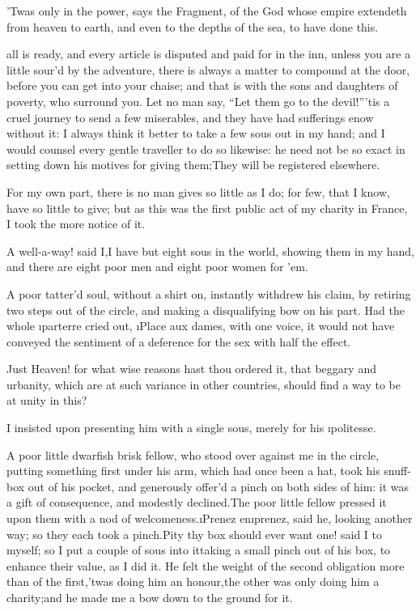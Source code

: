 \documentclass[twoside]{article}
\begin{document}
’Twas only in the power, says the Fragment, of the God whose empire
extendeth from heaven to earth, and even to the depths of the sea, to
have done this.






 all is ready, and every article is disputed and paid for in the inn,
unless you are a little sour’d by the adventure, there is always a matter
to compound at the door, before you can get into your chaise; and that is
with the sons and daughters of poverty, who surround you.  Let no man
say, “Let them go to the devil!”\tsk ’tis a cruel journey to send a few
miserables, and they have had sufferings enow without it: I always think
it better to take a few sous out in my hand; and I would counsel every
gentle traveller to do so likewise: he need not be so exact in setting
down his motives for giving them;\tsk They will be registered elsewhere.

For my own part, there is no man gives so little as I do; for few, that I
know, have so little to give; but as this was the first public act of my
charity in France, I took the more notice of it.

A well-a-way! said I,\tsk I have but eight sous in the world, showing them in
my hand, and there are eight poor men and eight poor women for ’em.

A poor tatter’d soul, without a shirt on, instantly withdrew his claim,
by retiring two steps out of the circle, and making a disqualifying bow
on his part.  Had the whole \i{parterre} cried out, \i{Place aux dames}, with
one voice, it would not have conveyed the sentiment of a deference for
the sex with half the effect.

Just Heaven! for what wise reasons hast thou ordered it, that beggary and
urbanity, which are at such variance in other countries, should find a
way to be at unity in this?

\tsk I insisted upon presenting him with a single sous, merely for his
\i{politesse}.

A poor little dwarfish brisk fellow, who stood over against me in the
circle, putting something first under his arm, which had once been a hat,
took his snuff-box out of his pocket, and generously offer’d a pinch on
both sides of him: it was a gift of consequence, and modestly
declined.\tsk The poor little fellow pressed it upon them with a nod of
welcomeness.\tsk \i{Prenez en}\tsk \i{prenez}, said he, looking another way; so they
each took a pinch.\tsk Pity thy box should ever want one! said I to myself;
so I put a couple of sous into it\tsk taking a small pinch out of his box, to
enhance their value, as I did it.  He felt the weight of the second
obligation more than of the first,\tsk ’twas doing him an honour,\tsk the other
was only doing him a charity;\tsk and he made me a bow down to the ground for
it.
\end{document}
